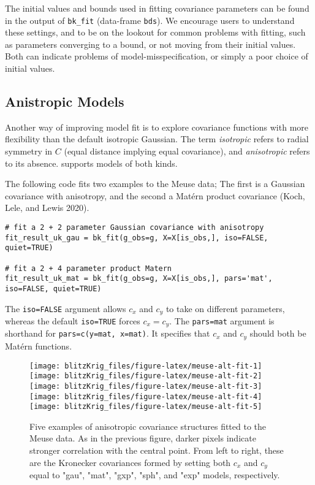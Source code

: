 The initial values and bounds used in fitting covariance parameters can be found in the output of \texttt{bk\_fit} (data-frame \texttt{bds}). We encourage users to understand these settings, and to be on the lookout for common problems with fitting, such as parameters converging to a bound, or not moving from their initial values. Both can indicate problems of model-misspecification, or simply a poor choice of initial values.

\hypertarget{anistropic-models}{%
\subsection{Anistropic Models}\label{anistropic-models}}

Another way of improving model fit is to explore covariance functions with more flexibility than the default isotropic Gaussian. The term \emph{isotropic} refers to radial symmetry in \(C\) (equal distance implying equal covariance), and \emph{anisotropic} refers to its absence.  supports models of both kinds.

The following code fits two examples to the Meuse data; The first is a Gaussian covariance with anisotropy, and the second a Matérn product covariance (Koch, Lele, and Lewis 2020).

\begin{verbatim}
# fit a 2 + 2 parameter Gaussian covariance with anisotropy
fit_result_uk_gau = bk_fit(g_obs=g, X=X[is_obs,], iso=FALSE, quiet=TRUE)

# fit a 2 + 4 parameter product Matern
fit_result_uk_mat = bk_fit(g_obs=g, X=X[is_obs,], pars='mat', iso=FALSE, quiet=TRUE)
\end{verbatim}

The \texttt{iso=FALSE} argument allows \(c_x\) and \(c_y\) to take on different parameters, whereas the default \texttt{iso=TRUE} forces \(c_x=c_y\). The \texttt{pars=\textquotesingle{}mat\textquotesingle{}} argument is shorthand for \texttt{pars=c(y=\textquotesingle{}mat\textquotesingle{},\ x=\textquotesingle{}mat\textquotesingle{})}. It specifies that \(c_x\) and \(c_y\) should both be Matérn functions.

\begin{figure}[!htb]
\texttt{[image: blitzKrig\_files/figure-latex/meuse-alt-fit-1]} \texttt{[image: blitzKrig\_files/figure-latex/meuse-alt-fit-2]} \texttt{[image: blitzKrig\_files/figure-latex/meuse-alt-fit-3]} \texttt{[image: blitzKrig\_files/figure-latex/meuse-alt-fit-4]} \texttt{[image: blitzKrig\_files/figure-latex/meuse-alt-fit-5]} \caption{Five examples of anisotropic covariance structures fitted to the Meuse data. As in the previous figure, darker pixels indicate stronger correlation with the central point. From left to right, these are the Kronecker covariances formed by setting both $c_x$ and $c_y$ equal to "gau", "mat", "gxp", "sph", and "exp" models, respectively.}\label{fig:meuse-alt-fit}
\end{figure}

